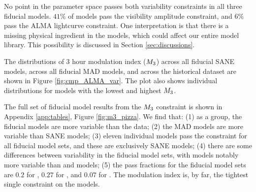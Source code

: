 No point in the parameter space passes both variability constraints in all three fiducial models. $41\%$ of models pass the visibility amplitude constraint, and $6\%$ pass the ALMA lightcurve constraint. One interpretation is that there is a missing physical ingredient in the models, which could affect our entire model library. This possibility is discussed in Section \ref{sec:discussions}.


The distributions of 3 hour modulation index ($M_{3}$) across all fiducial SANE models, across all fiducial MAD models, and across the historical dataset are shown in Figure \ref{fig:cmp_ALMA_var}.  The plot also shows individual distributions for models with the lowest and highest $M_{3}$.  

The full set of fiducial model results from the $M_{3}$ constraint is shown in Appendix \ref{app:tables}, Figure \ref{fig:m3_pizza}.  
We find that: (1) as a group, the fiducial models are more variable than the data; (2) the MAD models are more variable than SANE models; (3) eleven individual models  pass the constraint for all fiducial model sets, and these are exclusively SANE models; (4) there are some differences between variability in the fiducial model sets, with \hamr models notably more variable than \kharma and \bhac models; (5) the pass fractions for the fiducial model sets are $0.2$ for \kharma, $0.27$ for \bhac, and $0.07$ for \hamr.   The modulation index is, by far, the tightest single constraint on the models.  

